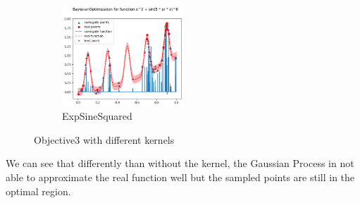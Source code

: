 \begin{figure}[H]
    \begin{subfigure}{\textwidth}
        \centering
        \includegraphics[width=0.5\textwidth]{lab6/imgs/obj3_exp.png}
        \caption{ExpSineSquared}
    \end{subfigure}
    \caption{Objective3 with different kernels}
    \label{fig:bo-kernel}
\end{figure}
We can see that differently than without the kernel, the Gaussian Process in not able to approximate the real function well but the sampled points are still in the optimal region.
